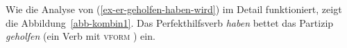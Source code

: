 Wie die Analyse von (\ref{ex-er-geholfen-haben-wird}) im Detail funktioniert, zeigt die Abbildung~\vref{abb-kombin1}.
Das Perfekthilfsverb \emph{haben} bettet das Partizip \emph{geholfen} (ein Verb mit \textsc{vform} )
ein. 
